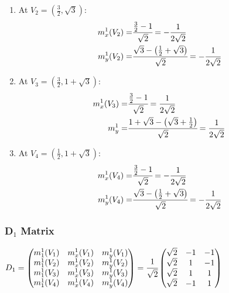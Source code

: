 \documentclass{article}
\begin{document}
{\begin{multicols}{2}
\begin{enumerate}
    \item At $V_2 = \left(\frac{3}{2},\sqrt{3}\right):$
    \begin{align*}
    m_x^1(V_2) =& \cfrac{\frac{3}{2}-1}{\sqrt{2}} = -\frac{1}{2\sqrt{2}}\\
    m_y^1(V_2) =& \cfrac{\sqrt{3} - \left(\frac{1}{2} + \sqrt{3}\right)}{\sqrt{2}} =-\cfrac{1}{2\sqrt{2}}
    \end{align*}

    \item At $V_3 = \left(\frac{3}{2},1+\sqrt{3}\right):$
    \begin{align*}
    m_x^1(V_3) =& \cfrac{\frac{3}{2}-1}{\sqrt{2}} = \frac{1}{2\sqrt{2}}\\
    m_y^1 =& \cfrac{1+\sqrt{3} -\left(\sqrt{3} + \frac{1}{2}\right)}{\sqrt{2}} = \frac{1}{2\sqrt{2}}
    \end{align*}

    \item At $V_4 = \left(\frac{1}{2},1+\sqrt{3}\right):$
    \begin{align*}
    m_x^1(V_4) =& \cfrac{\frac{3}{2}-1}{\sqrt{2}} = -\frac{1}{2\sqrt{2}}\\
    m_y^1(V_4) =& \cfrac{\sqrt{3} - \left(\frac{1}{2} + \sqrt{3}\right)}{\sqrt{2}} =-\cfrac{1}{2\sqrt{2}}
    \end{align*}
\end{enumerate}
\end{multicols}

\subsubsection{D$_1$ Matrix}
$D_1 = \begin{pmatrix}
    m_1^1(V_1) & m_x^1(V_1) & m_y^1(V_1)\\
    m_1^1(V_2) & m_x^1(V_2) & m_y^1(V_2)\\
    m_1^1(V_3) & m_x^1(V_3) & m_y^1(V_3)\\
    m_1^1(V_4) & m_x^1(V_4) & m_y^1(V_4)\\
\end{pmatrix} =
\cfrac{1}{\sqrt{2}}\begin{pmatrix}
    \sqrt{2} & -1 & -1\\
    \sqrt{2} & 1 & -1\\
    \sqrt{2} & 1 & 1\\
    \sqrt{2} & -1 & 1\\
\end{pmatrix}$


}
\end{document}
